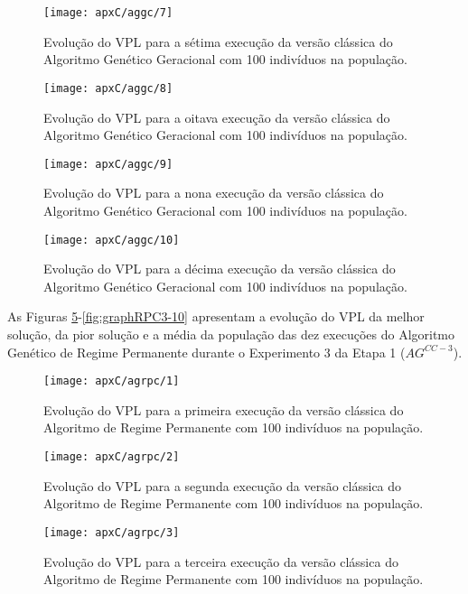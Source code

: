 \begin{figure}[H]
\centering
\texttt{[image: apxC/aggc/7]}
\caption{Evolução do VPL para a sétima execução da versão clássica do Algoritmo Genético Geracional com 100 indivíduos na população.}
\label{fig:graphGC3-07}
\end{figure}

\begin{figure}[H]
\centering
\texttt{[image: apxC/aggc/8]}
\caption{Evolução do VPL para a oitava execução da versão clássica do Algoritmo Genético Geracional com 100 indivíduos na população.}
\label{fig:graphGC3-08}
\end{figure}

\begin{figure}[H]
\centering
\texttt{[image: apxC/aggc/9]}
\caption{Evolução do VPL para a nona execução da versão clássica do Algoritmo Genético Geracional com 100 indivíduos na população.}
\label{fig:graphGC3-09}
\end{figure}

\begin{figure}[H]
\centering
\texttt{[image: apxC/aggc/10]}
\caption{Evolução do VPL para a décima execução da versão clássica do Algoritmo Genético Geracional com 100 indivíduos na população.}
\label{fig:graphGC3-10}
\end{figure}

As Figuras \ref{fig:graphRPC3-01}-\ref{fig:graphRPC3-10} apresentam a evolução do VPL da melhor solução, da pior solução e a média da população das dez execuções do Algoritmo Genético de Regime Permanente durante o Experimento 3 da Etapa 1 ($AG^{CC-3}$).

\begin{figure}[H]
\centering
\texttt{[image: apxC/agrpc/1]}
\caption{Evolução do VPL para a primeira execução da versão clássica do Algoritmo de Regime Permanente com 100 indivíduos na população.}
\label{fig:graphRPC3-01}
\end{figure}

\begin{figure}[H]
\centering
\texttt{[image: apxC/agrpc/2]}
\caption{Evolução do VPL para a segunda execução da versão clássica do Algoritmo de Regime Permanente com 100 indivíduos na população.}
\label{fig:graphRPC3-02}
\end{figure}
\begin{figure}[H]
\centering

\texttt{[image: apxC/agrpc/3]}
\caption{Evolução do VPL para a terceira execução da versão clássica do Algoritmo de Regime Permanente com 100 indivíduos na população.}
\label{fig:graphRPC3-03}
\end{figure}

